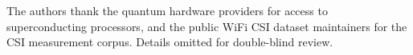 \documentclass[sigconf,anonymous,review]{acmart}
\theoremstyle{acmdefinition}%
\theoremstyle{acmplain}%
\begin{document}
\begin{acks}
The authors thank the quantum hardware providers for access to
superconducting processors, and the public WiFi CSI dataset
maintainers for the CSI measurement corpus.
Details omitted for double-blind review.
\end{acks}



\end{document}
